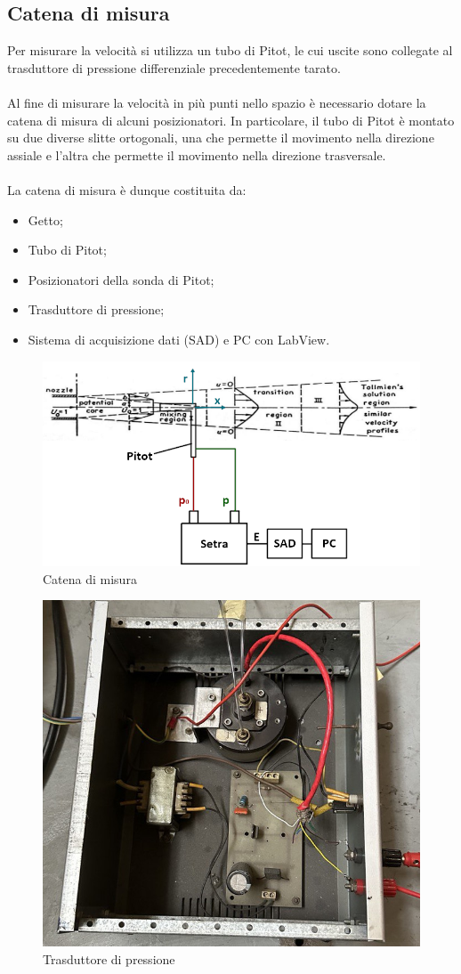 \subsection{Catena di misura}
Per misurare la velocità si utilizza un tubo di Pitot, le cui uscite sono collegate al trasduttore di pressione differenziale precedentemente tarato.\\\\
Al fine di misurare la velocità in più punti nello spazio è necessario dotare la catena di misura di alcuni posizionatori. In particolare, il tubo di Pitot è montato su due diverse slitte ortogonali, una che permette il movimento nella direzione assiale e l'altra che permette il movimento nella direzione trasversale.\\\\
La catena di misura è dunque costituita da:
\begin{itemize}
    \item Getto;
    \item Tubo di Pitot;
    \item Posizionatori della sonda di Pitot;
    \item Trasduttore di pressione;
    \item Sistema di acquisizione dati (SAD) e PC con LabView.
\end{itemize}
\begin{figure}[H]
    \centering
    \includegraphics[width=.85\textwidth]{images/3/catena.png}
    \caption{Catena di misura}
\end{figure}
\begin{figure}[H]
    \centering
    \includegraphics[width=.5\textwidth]{images/3/trasd.jpg}
    \caption{Trasduttore di pressione}
\end{figure}
